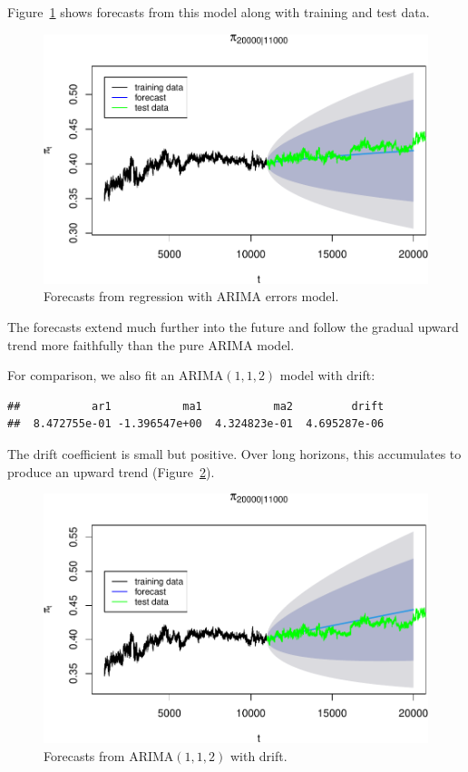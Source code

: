 \documentclass[final,11pt]{article}
\theoremstyle{plain}
\theoremstyle{remark}
\begin{document}
Figure~\ref{fig:theory} shows forecasts from this model along with
training and test data.

\begin{figure}
\includegraphics{paper_files/figure-latex/unnamed-chunk-20-1.pdf}
\caption{Forecasts from regression with ARIMA errors model.}
\label{fig:theory}
\end{figure}

The forecasts extend much further into the future and follow the gradual
upward trend more faithfully than the pure ARIMA model.

For comparison, we also fit an ARIMA$(1,1,2)$ model with drift:

\begin{verbatim}
##           ar1           ma1           ma2         drift
##  8.472755e-01 -1.396547e+00  4.324823e-01  4.695287e-06
\end{verbatim}

The drift coefficient is small but positive. Over long horizons, this
accumulates to produce an upward trend (Figure~\ref{fig:drift}).

\begin{figure}
\includegraphics{paper_files/figure-latex/unnamed-chunk-22-1.pdf}
\caption{Forecasts from ARIMA$(1,1,2)$ with drift.}
\label{fig:drift}
\end{figure}
\end{document}
